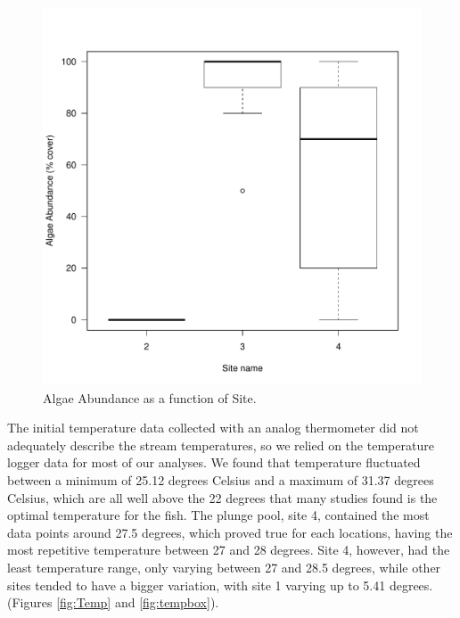 \documentclass{article}\usepackage[]{graphicx}\usepackage[]{color}
\makeatletter
\def\maxwidth{ %
  \ifdim\Gin@nat@width>\linewidth
    \linewidth
  \else
    \Gin@nat@width
  \fi
}
\newenvironment{knitrout}{}{} %
\makeatother
\begin{document}
\begin{figure}[!ht]
\begin{knitrout}
\color{fgcolor}
\includegraphics[width=\maxwidth]{figure/unnamed-chunk-3-1} 

\end{knitrout}
\caption{Algae Abundance as a function of Site.}
\label{fig:algaesite}
\end{figure}

The initial temperature data collected with an analog thermometer did not adequately describe the stream temperatures, so we relied on the temperature logger data for most of our analyses. We found that temperature fluctuated between a minimum of 25.12 degrees Celsius and a maximum of 31.37 degrees Celsius, which are all well above the 22 degrees that many studies found is the optimal temperature for the fish. The plunge pool, site 4, contained the most data points around 27.5 degrees, which proved true for each locations, having the most repetitive temperature between 27 and 28 degrees. Site 4, however, had the least temperature range, only varying between 27 and 28.5 degrees, while other sites tended to have a bigger variation, with site 1 varying up to 5.41 degrees. (Figures \ref{fig:Temp} and \ref{fig:tempbox}).
\end{document}
